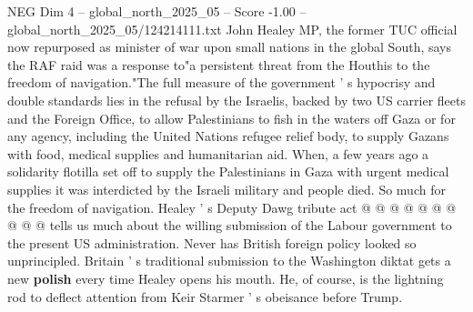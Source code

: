 \begin{textsample}{NEG Dim 4 – global\_north\_2025\_05 – Score -1.00 – global\_north\_2025\_05/124214111.txt}
John Healey MP, the former TUC official now repurposed as minister of war upon small nations in the global South, says the RAF raid was a response to"a persistent threat from the Houthis to the freedom of navigation."The full measure of the government ' s hypocrisy and double standards lies in the refusal by the Israelis, backed by two US carrier fleets and the Foreign Office, to allow Palestinians to fish in the waters off Gaza or for any agency, including the United Nations refugee relief body, to supply Gazans with food, medical supplies and humanitarian aid.
When, a few years ago a solidarity flotilla set off to supply the Palestinians in Gaza with urgent medical supplies it was interdicted by the Israeli military and people died.
So much for the freedom of navigation.
Healey ' s Deputy Dawg tribute act @ @ @ @ @ @ @ @ @ @ tells us much about the willing submission of the Labour government to the present US administration.
Never has British foreign policy looked so unprincipled.
Britain ' s traditional submission to the Washington diktat gets a new \textbf{polish} every time Healey opens his mouth.
He, of course, is the lightning rod to deflect attention from Keir Starmer ' s obeisance before Trump.

\end{textsample}
